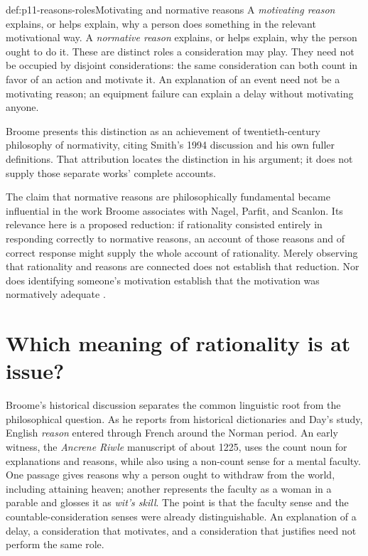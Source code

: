 \begin{hbdefinition}{def:p11-reasons-roles}{Motivating and normative reasons}
A \emph{motivating reason} explains, or helps explain, why a person does
something in the relevant motivational way. A \emph{normative reason}
explains, or helps explain, why the person ought to do it. These are distinct
roles a consideration may play. They need not be occupied by disjoint
considerations: the same consideration can both count in favor of an action
and motivate it. An explanation of an event need not be a motivating reason;
an equipment failure can explain a delay without motivating anyone.
\end{hbdefinition}

Broome presents this distinction as an achievement of twentieth-century
philosophy of normativity, citing Smith's 1994 discussion and his own fuller
definitions. That attribution locates the distinction in his argument;
it does not supply those separate works' complete accounts.

The claim that normative reasons are philosophically fundamental became
influential in the work Broome associates with Nagel, Parfit, and Scanlon.
Its relevance here is a proposed reduction: if rationality consisted entirely
in responding correctly to normative reasons, an account of those reasons and
of correct response might supply the whole account of rationality. Merely
observing that rationality and reasons are connected does not establish that
reduction. Nor does identifying someone's motivation establish that the
motivation was normatively adequate
\parencite[p.~129 and p.~135, n.~1]{Broome2021ReasonsRationality}.

\section{Which meaning of rationality is at issue?}
\label{sec:p11-reasons-meaning}

Broome's historical discussion separates the common linguistic root from the
philosophical question. As he reports from historical dictionaries and Day's
study, English \emph{reason} entered through French around the Norman period.
An early witness, the \emph{Ancrene Riwle} manuscript of about 1225, uses the
count noun for explanations and reasons, while also using a non-count sense
for a mental faculty. One passage gives reasons why a person ought to withdraw
from the world, including attaining heaven; another represents the faculty
as a woman in a parable and glosses it as \emph{wit's skill}.
The point is that the faculty sense and the countable-consideration senses were
already distinguishable. An explanation of a delay, a consideration that
motivates, and a consideration that justifies need not perform the same role.

